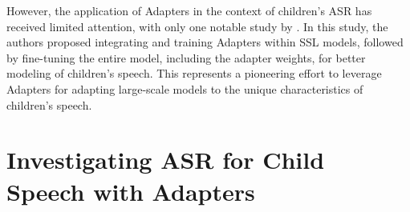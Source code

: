 However, the application of Adapters in the context of children's ASR has received limited attention, with only one notable study by \cite{fan2022draft}. In this study, the authors proposed integrating and training Adapters within SSL models, followed by fine-tuning the entire model, including the adapter weights, for better modeling of children's speech. This represents a pioneering effort to leverage Adapters for adapting large-scale models to the unique characteristics of children's speech.

\section{Investigating ASR for Child Speech with Adapters}


